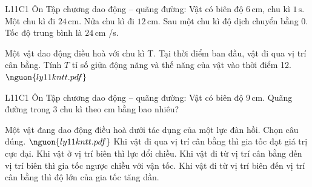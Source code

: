 

\begin{ex}
L11C1 Ôn Tập chương dao động – quãng đường: Vật có biên độ $6\,\text{cm}$, chu kì $1\,\text{s}$.
\choiceTF
{\True Một chu kì đi $24\,\text{cm}$.}
{\True Nửa chu kì đi $12\,\text{cm}$.}
{\True Sau một chu kì độ dịch chuyển bằng 0.}
{\True Tốc độ trung bình là $24\,\text{cm}$ /s.}
\end{ex}

\begin{ex}
Một vật dao động điều hoà với chu kì T. Tại thời điểm ban đầu, vật đi qua vị trí cân bằng. Tính $T$ tỉ số giữa động năng và thế năng của vật vào thời điểm 12. $\nguon{ly11 kntt.pdf}$
\choiceTF

\end{ex}

\begin{ex}
L11C1 Ôn Tập chương dao động – quãng đường: Vật có biên độ $9\,\text{cm}$. Quãng đường trong 3 chu kì theo cm bằng bao nhiêu?
\end{ex}

\begin{ex}
Một vật đang dao động điều hoà dưới tác dụng của một lực đàn hồi. Chọn câu đúng. $\nguon{ly11 kntt.pdf}$
\choice
{Khi vật đi qua vị trí cân bằng thì gia tốc đạt giá trị cực đại.}
{Khi vật ở vị trí biên thì lực đổi chiều.}
{\True Khi vật đi từ vị trí cân bằng đến vị trí biên thì gia tốc ngược chiều với vận tốc.}
{Khi vật đi từ vị trí biên đến vị trí cân bằng thì độ lớn của gia tốc tăng dần.}
\end{ex}

